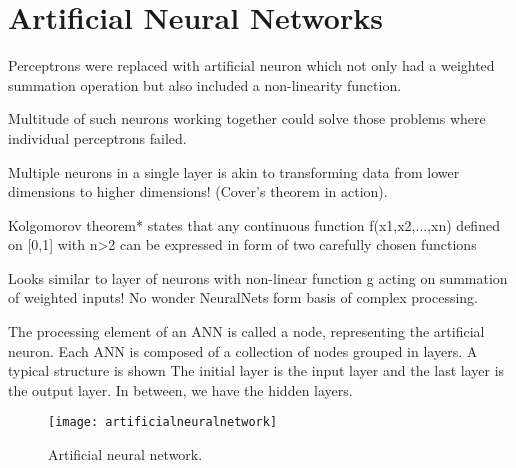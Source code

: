 	\section{Artificial Neural Networks}

	\begin{bulletedlist}
		\item Perceptrons were replaced with artificial neuron which not only had a weighted summation operation but also included a non-linearity function.
		\item Multitude of such neurons working together could solve those problems where individual perceptrons failed.
		\item Multiple neurons in a single layer is akin to transforming data from lower dimensions to higher dimensions! (Cover's theorem in action).
		\item Kolgomorov theorem* states that any continuous function f(x1,x2,...,xn) defined on [0,1] with n>2 can be expressed in form of two carefully chosen functions
		\item Looks similar to layer of neurons with non-linear function g acting on summation of weighted inputs!  No wonder NeuralNets form basis of complex processing.
		\item The processing element of an ANN is called a node, representing the artificial neuron.  Each ANN is composed of a collection of nodes grouped in layers. A typical structure is shown The initial layer is the input layer and the last layer is the output layer.  In between, we have the hidden layers.
	\end{bulletedlist}
 	\begin{figure}[h]
		\centering
		\texttt{[image: artificialneuralnetwork]}
		\caption[Artificial neural network]{Artificial neural network.}
		\label{fig:artificialneuralnetwork}
	\end{figure}

